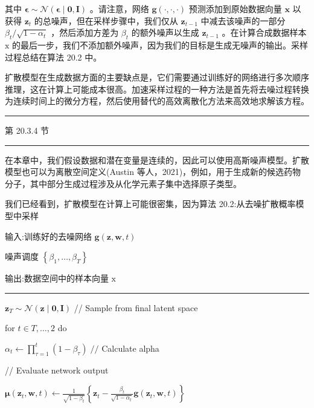 \documentclass[10pt]{report}
\newcommand{\HRule}{\begin{center}\rule{0.9\linewidth}{0.2mm}\end{center}}
\begin{document}
其中 \(\mathbf{\epsilon } \sim  \mathcal{N}\left( {\mathbf{\epsilon } \mid  \mathbf{0},\mathbf{I}}\right)\) 。请注意，网络 \(\mathbf{g}\left( {\cdot ,\cdot , \cdot  }\right)\) 预测添加到原始数据向量 \(\mathbf{x}\) 以获得 \({\mathbf{z}}_{t}\) 的总噪声，但在采样步骤中，我们仅从 \({\mathbf{z}}_{t - 1}\) 中减去该噪声的一部分 \({\beta }_{t}/\sqrt{1 - {\alpha }_{t}}\) ，然后添加方差为 \({\beta }_{t}\) 的额外噪声以生成 \({\mathbf{z}}_{t - 1}\) 。在计算合成数据样本 \(\mathrm{x}\) 的最后一步，我们不添加额外噪声，因为我们的目标是生成无噪声的输出。采样过程总结在算法 20.2 中。

扩散模型在生成数据方面的主要缺点是，它们需要通过训练好的网络进行多次顺序推理，这在计算上可能成本很高。加速采样过程的一种方法是首先将去噪过程转换为连续时间上的微分方程，然后使用替代的高效离散化方法来高效地求解该方程。

\HRule

第 20.3.4 节

\HRule

在本章中，我们假设数据和潜在变量是连续的，因此可以使用高斯噪声模型。扩散模型也可以为离散空间定义(Austin 等人，2021)，例如，用于生成新的候选药物分子，其中部分生成过程涉及从化学元素子集中选择原子类型。

我们已经看到，扩散模型在计算上可能很密集，因为算法 20.2:从去噪扩散概率模型中采样

输入:训练好的去噪网络 \(\mathbf{g}\left( {\mathbf{z},\mathbf{w},t}\right)\)

噪声调度 \(\left\{  {{\beta }_{1},\ldots ,{\beta }_{T}}\right\}\)

输出:数据空间中的样本向量 \(\mathrm{x}\)

\HRule

\({\mathbf{z}}_{T} \sim  \mathcal{N}\left( {\mathbf{z} \mid  \mathbf{0},\mathbf{I}}\right)\) // Sample from final latent space

for \(t \in  T,\ldots ,2\) do

\hspace*{1em} \({\alpha }_{t} \leftarrow  \mathop{\prod }\limits_{{\tau  = 1}}^{t}\left( {1 - {\beta }_{\tau }}\right) \;//\) Calculate alpha

\hspace*{1em} // Evaluate network output

\hspace*{1em} \(\mathbf{\mu }\left( {{\mathbf{z}}_{t},\mathbf{w},t}\right)  \leftarrow  \frac{1}{\sqrt{1 - {\beta }_{t}}}\left\{  {{\mathbf{z}}_{t} - \frac{{\beta }_{t}}{\sqrt{1 - {\alpha }_{t}}}\mathbf{g}\left( {{\mathbf{z}}_{t},\mathbf{w},t}\right) }\right\}\)
\end{document}
